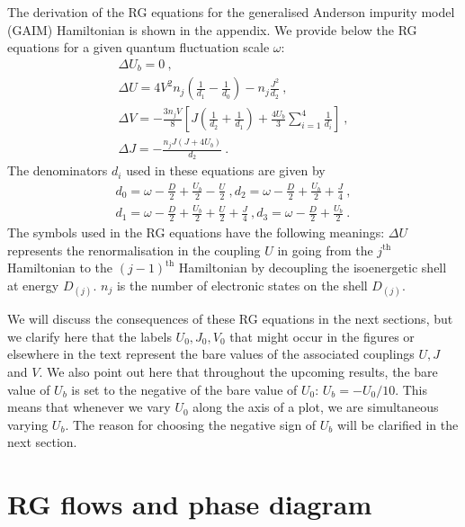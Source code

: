 \documentclass[reprint,superscriptaddress,floatfix]{revtex4-2}
\begin{document}
The derivation of the RG equations for the generalised Anderson impurity model (GAIM) Hamiltonian is shown in the appendix. We provide below the RG equations for a given quantum fluctuation scale \(\omega\):
\begin{gather}
	\Delta U_b = 0~,\\
	\Delta U = 4V^2 n_j\left(\frac{1}{d_1} - \frac{1}{d_0}\right) - n_j\frac{J^2}{d_2}~,\\
	\Delta V = -\frac{3n_j V}{8}\left[J\left(\frac{1}{d_2} + \frac{1}{d_1}\right) +  \frac{4U_b}{3}\sum_{i=1}^4 \frac{1}{d_i}\right]~,\\
	\Delta J = -\frac{n_j J\left(J + 4U_b\right)}{d_2}~.
\end{gather}
The denominators \(d_i\) used in these equations are given by
\begin{gather}
	d_0 = \omega - \frac{D}{2} + \frac{U_b}{2} - \frac{U}{2}~,d_2 = \omega - \frac{D}{2} + \frac{U_b}{2} + \frac{J}{4}~,\\
	d_1 = \omega - \frac{D}{2} + \frac{U_b}{2} + \frac{U}{2} + \frac{J}{4}~,d_3 = \omega - \frac{D}{2} + \frac{U_b}{2}~.
\end{gather}
The symbols used in the RG equations have the following meanings: \(\Delta U\) represents the renormalisation in the coupling \(U\) in going from the \(j^\text{th}\) Hamiltonian to the \(\left( j-1 \right) ^\text{th}\) Hamiltonian by decoupling the isoenergetic shell at energy \(D_{(j)}\). \(n_j\) is the number of electronic states on the shell \(D_{(j)}\).

We will discuss the consequences of these RG equations in the next sections, but we clarify here that the labels \(U_0,J_0,V_0\) that might occur in the figures or elsewhere in the text represent the bare values of the associated couplings \(U,J\) and \(V\). We also point out here that throughout the upcoming results, the bare value of \(U_b\) is set to the negative of the bare value of \(U_0\): \(U_b = -U_0/10\). This means that whenever we vary \(U_0\) along the axis of a plot, we are simultaneous varying \(U_b\). The reason for choosing the negative sign of \(U_b\) will be clarified in the next section.

\section{RG flows and phase diagram}
\label{phase}
\end{document}

